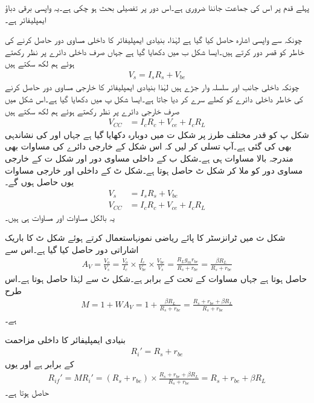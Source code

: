 پہلے قدم پر اس کی جماعت جاننا ضروری ہے۔اس دور پر تفصیلی بحث ہو چکی ہے۔یہ واپسی برقی دباؤ ایمپلیفائر ہے۔

چونکہ  سے واپسی اشارہ حاصل کیا گیا ہے لہٰذا، بنیادی ایمپلیفائر کا داخلی مساوی دور حاصل کرنے کی خاطر  کو قصر دور کرتے ہیں۔ایسا شکل  ب میں دکھایا گیا ہے جہاں صرف داخلی دائرے پر نظر رکھتے ہوئے ہم لکھ سکتے ہیں
\begin{align} \label{مساوات_واپسی_برقی_دباو_داخلی_مساوی}
V_s = I_s R_s +V_{be}
\end{align}
چونکہ داخلی جانب  اور  سلسلہ وار جڑے ہیں لہٰذا بنیادی ایمپلیفائر کا خارجی مساوی دور حاصل کرنے کی خاطر داخلی دائرے کو کھلے سرے کر دیا جاتا ہے۔ایسا شکل  پ میں دکھایا گیا ہے۔اس شکل میں صرف خارجی دائرے پر نظر رکھتے ہوئے ہم لکھ سکتے ہیں
\begin{align} \label{مساوات_واپسی_برقی_دباو_خارجی_مساوی}
V_{CC} &= I_c R_c+V_{ce}+I_c R_L 
\end{align}
شکل  پ کو قدر مختلف طرز پر شکل  ت میں دوبارہ دکھایا گیا ہے جہاں  اور  کی نشاندہی بھی کی گئی ہے۔آپ تسلی کر لیں کہ اس شکل کے 
خارجی دائرے کی مساوات  بھی مندرجہ بالا مساوات ہی ہے۔شکل  ب کے داخلی مساوی دور اور شکل  ت کے خارجی مساوی دور کو ملا کر شکل  ٹ حاصل ہوتا ہے۔شکل  ٹ کے داخلی اور خارجی مساوات یوں حاصل ہوں گے۔
\begin{align}
V_s &= I_s R_s +V_{be}\\
V_{CC} &= I_c R_c+V_{ce}+I_c R_L
\end{align}
یہ بالکل مساوات  اور مساوات  ہی ہیں۔

شکل  ث میں ٹرانزسٹر کا پائے ریاضی نمونہاستعمال کرتے ہوئے شکل  ٹ کا باریک اشاراتی دور حاصل کیا گیا ہے۔اس سے
\begin{align} \label{مساوات_واپسی_ٹرانزسٹر_تابع_مخارج_افزائش}
A_V=\frac{V_o}{V_s}=\frac{V_o}{I_c} \times \frac{I_c}{V_{be}} \times \frac{V_{be}}{V_s}=\frac{R_L g_m r_{be}}{R_s+r_{be}}=\frac{\beta R_L}{R_s+r_{be}}
\end{align}
حاصل ہوتا ہے جہاں مساوات  کے تحت  کے برابر ہے۔شکل  ٹ سے    لہٰذا  حاصل ہوتا ہے۔اس طرح
\begin{align}
M=1+W A_V=1+\frac{\beta R_L}{R_s+r_{be}}=\frac{R_s+r_{be}+\beta R_L}{R_s+r_{be}}
\end{align}
ہے۔

بنیادی ایمپلیفائر کا داخلی مزاحمت
\begin{align}
R_i'=R_s+r_{be}
\end{align}
کے برابر ہے اور یوں
\begin{align}
R_{if}'=M R_i' =\left (R_s+r_{be} \right) \times \frac{R_s+r_{be}+\beta R_L}{R_s+r_{be}}=R_s+r_{be}+\beta R_L
\end{align}
حاصل ہوتا ہے۔


